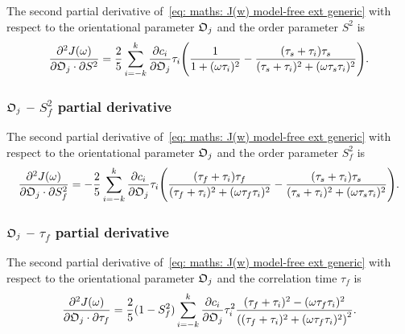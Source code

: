 The second partial derivative of~\eqref{eq: maths: J(w) model-free ext generic} with respect to the orientational parameter $\mathfrak{O}_j$ and the order parameter $S^2$ is
\begin{equation}
    \frac{\partial^2 J(\omega)}{\partial \mathfrak{O}_j \cdot \partial S^2} = \frac{2}{5} \sum_{i=-k}^k \frac{\partial c_i}{\partial \mathfrak{O}_j} \tau_i \Bigg(
        \frac{1}{1 + (\omega \tau_i)^2}
        - \frac{(\tau_s + \tau_i)\tau_s}{(\tau_s + \tau_i)^2 + (\omega \tau_s \tau_i)^2}
    \Bigg).
\end{equation}



\subsubsection{$\mathfrak{O}_j$ -- $S^2_f$ partial derivative}

The second partial derivative of~\eqref{eq: maths: J(w) model-free ext generic} with respect to the orientational parameter $\mathfrak{O}_j$ and the order parameter $S^2_f$ is
\begin{equation}
    \frac{\partial^2 J(\omega)}{\partial \mathfrak{O}_j \cdot \partial S^2_f} = -\frac{2}{5} \sum_{i=-k}^k \frac{\partial c_i}{\partial \mathfrak{O}_j} \tau_i \Bigg(
        \frac{(\tau_f + \tau_i)\tau_f}{(\tau_f + \tau_i)^2 + (\omega \tau_f \tau_i)^2}
        - \frac{(\tau_s + \tau_i)\tau_s}{(\tau_s + \tau_i)^2 + (\omega \tau_s \tau_i)^2}
    \Bigg).
\end{equation}



\subsubsection{$\mathfrak{O}_j$ -- $\tau_f$ partial derivative}

The second partial derivative of~\eqref{eq: maths: J(w) model-free ext generic} with respect to the orientational parameter $\mathfrak{O}_j$ and the correlation time $\tau_f$ is
\begin{equation}
    \frac{\partial^2 J(\omega)}{\partial \mathfrak{O}_j \cdot \partial \tau_f} = \frac{2}{5} (1 - S^2_f) \sum_{i=-k}^k
        \frac{\partial c_i}{\partial \mathfrak{O}_j} \tau_i^2
        \frac{(\tau_f + \tau_i)^2 - (\omega \tau_f \tau_i)^2}{\left((\tau_f + \tau_i)^2 + (\omega \tau_f \tau_i)^2 \right)^2}.
\end{equation}



